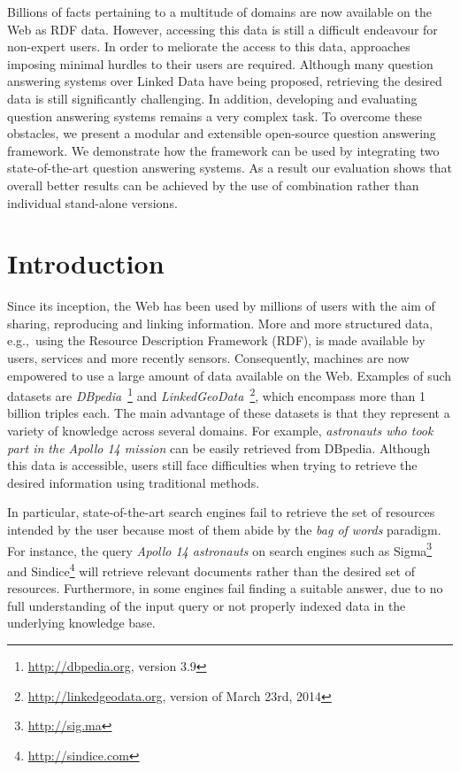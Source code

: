 Billions of facts pertaining to a multitude of domains are now available on the Web as RDF data.
However, accessing this data is still a difficult endeavour for non-expert users.
In order to meliorate the access to this data, approaches imposing minimal hurdles to their users are required.
Although many question answering systems over Linked Data have being proposed, retrieving the desired data is still significantly challenging.
In addition, developing and evaluating question answering systems remains a very complex task.
To overcome these obstacles, we present a modular and extensible open-source question answering framework.
We demonstrate how the framework can be used by integrating two state-of-the-art question answering systems.
As a result our evaluation shows that overall better results can be achieved by the use of combination rather than individual stand-alone versions.

\section{Introduction}
\label{chaopenqa:sec:introduction}

Since its inception, the Web has been used by millions of users with the aim of sharing, reproducing and linking information.
More and more structured data, e.g.,~using the Resource Description Framework (RDF), is made available by users, services and more recently sensors.
Consequently, machines are now empowered to use a large amount of data available on the Web.
Examples of such datasets are \emph{DBpedia}~\cite{dbpedia-swj}\footnote{\url{http://dbpedia.org}, version 3.9} and \emph{LinkedGeoData}~\cite{SLHA11}\footnote{\url{http://linkedgeodata.org}, version of March 23rd, 2014}, which encompass more than 1 billion triples each.
The main advantage of these datasets is that they represent a variety of knowledge across several domains.
For example, \textit{astronauts who took part in the Apollo 14 mission} can be easily retrieved from DBpedia.
Although this data is accessible, users still face difficulties when trying to retrieve the desired information using traditional methods.

In particular, state-of-the-art search engines fail to retrieve the set of resources intended by the user because most of them abide by the \textit{bag of words} paradigm.
For instance, the query \textit{Apollo 14 astronauts} on search engines such as Sigma\footnote{\url{http://sig.ma}} and Sindice\footnote{\url{http://sindice.com}} will retrieve relevant documents rather than the desired set of resources.
Furthermore, in some engines fail finding a suitable answer, due to no full understanding of the input query or not properly indexed data in the underlying knowledge base.

